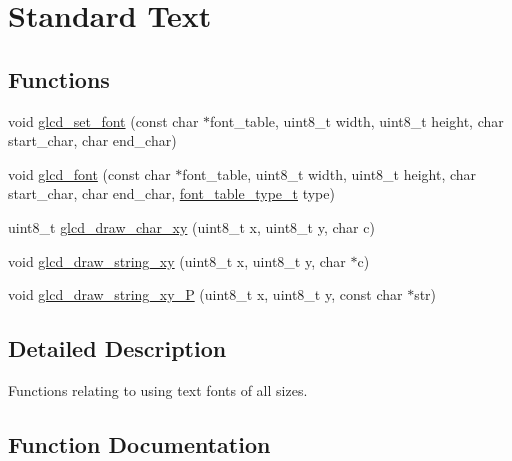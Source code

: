 \hypertarget{group___standard_text}{}\section{Standard Text}
\label{group___standard_text}
\subsection*{Functions}
\begin{DoxyCompactItemize}
\item 
void \hyperlink{group___standard_text_gababc52ef5bcc974352ba1eed55ac69c5}{glcd\+\_\+set\+\_\+font} (const char $\ast$font\+\_\+table, uint8\+\_\+t width, uint8\+\_\+t height, char start\+\_\+char, char end\+\_\+char)
\item 
void \hyperlink{group___standard_text_gab12a33e4f7636e7983787d8b206236a0}{glcd\+\_\+font} (const char $\ast$font\+\_\+table, uint8\+\_\+t width, uint8\+\_\+t height, char start\+\_\+char, char end\+\_\+char, \hyperlink{glcd_8h_aa7d560e99250d8d8f19117bd74e4924b}{font\+\_\+table\+\_\+type\+\_\+t} type)
\item 
uint8\+\_\+t \hyperlink{group___standard_text_gaa3055d2a67e6873d7648a7e9b22e1595}{glcd\+\_\+draw\+\_\+char\+\_\+xy} (uint8\+\_\+t x, uint8\+\_\+t y, char c)
\item 
void \hyperlink{group___standard_text_gafdab45b39499dfbcfdb5940b1b5c80c5}{glcd\+\_\+draw\+\_\+string\+\_\+xy} (uint8\+\_\+t x, uint8\+\_\+t y, char $\ast$c)
\item 
void \hyperlink{group___standard_text_ga3fc7d7941f82f6ba2959f60de3c7a3c9}{glcd\+\_\+draw\+\_\+string\+\_\+xy\+\_\+\+P} (uint8\+\_\+t x, uint8\+\_\+t y, const char $\ast$str)
\end{DoxyCompactItemize}


\subsection{Detailed Description}
Functions relating to using text fonts of all sizes. 

\subsection{Function Documentation}
\hypertarget{group___standard_text_gaa3055d2a67e6873d7648a7e9b22e1595}{}
